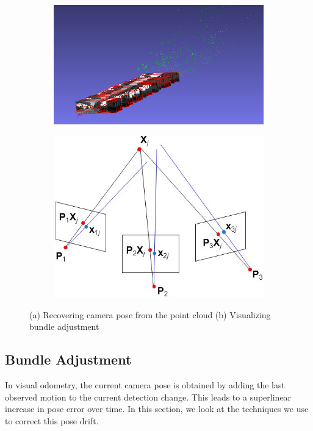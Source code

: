 \documentclass{article}
\begin{document}
\begin{figure}
    \centering
    \begin{subfigure}[b]{.45\linewidth}
        \centering
        \includegraphics[width=\linewidth]{./camera-pose.png}
        \caption{}
        \label{fig:camerapose}
    \end{subfigure}
    \begin{subfigure}[b]{.45\linewidth}
        \centering
        \includegraphics[width=.7\linewidth]{./bundle-adjustment.png}
        \caption{}
        \label{fig:ba}
    \end{subfigure}
    \caption{(a) Recovering camera pose from the point cloud (b) Visualizing bundle adjustment}
\end{figure}

\subsection{Bundle Adjustment}
In visual odometry, the current camera pose is obtained by adding the last observed motion to the current detection change. This leads to a superlinear increase in pose error over time. In this section, we look at the techniques we use to correct this pose drift.
\end{document}
